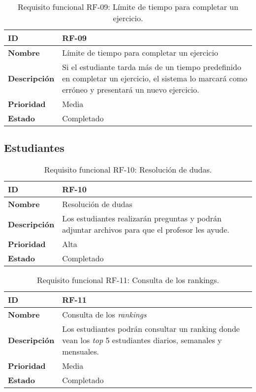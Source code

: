 \begin{table}[H]
    \centering
    \begin{tabular}{|l|p{9.5cm}|}
        \hline
        \textbf{ID} & RF-09 \\
        \hline
        \textbf{Nombre} & Límite de tiempo para completar un ejercicio \\
        \hline
        \textbf{Descripción} & Si el estudiante tarda más de un tiempo predefinido en completar un ejercicio, el sistema lo marcará como erróneo y presentará un nuevo ejercicio. \\
        \hline
        \textbf{Prioridad} & Media \\
        \hline
        \textbf{Estado} & Completado \\
        \hline
    \end{tabular}
    \caption{Requisito funcional RF-09: Límite de tiempo para completar un ejercicio.}
    \label{table:req-RF00Y}
\end{table}

\subsection{Estudiantes}

\begin{table}[H]
    \centering
    \begin{tabular}{|l|p{9.5cm}|}
        \hline
        \textbf{ID} & RF-10 \\
        \hline
        \textbf{Nombre} & Resolución de dudas \\
        \hline
        \textbf{Descripción} & Los estudiantes realizarán preguntas y podrán adjuntar archivos para que el profesor les ayude. \\
        \hline
        \textbf{Prioridad} & Alta \\
        \hline
        \textbf{Estado} & Completado \\
        \hline
    \end{tabular}
    \caption{Requisito funcional RF-10: Resolución de dudas.}
    \label{table:req-RF006}
\end{table}

\begin{table}[H]
    \centering
    \begin{tabular}{|l|p{9.5cm}|}
        \hline
        \textbf{ID} & RF-11 \\
        \hline
        \textbf{Nombre} & Consulta de los \textit{rankings} \\
        \hline
        \textbf{Descripción} & Los estudiantes podrán consultar un ranking donde vean los \textit{top} 5 estudiantes diarios, semanales y mensuales. \\
        \hline
        \textbf{Prioridad} & Media \\
        \hline
        \textbf{Estado} & Completado \\
        \hline
    \end{tabular}
    \caption{Requisito funcional RF-11: Consulta de los rankings.}
    \label{table:req-RF00Z}
\end{table}

